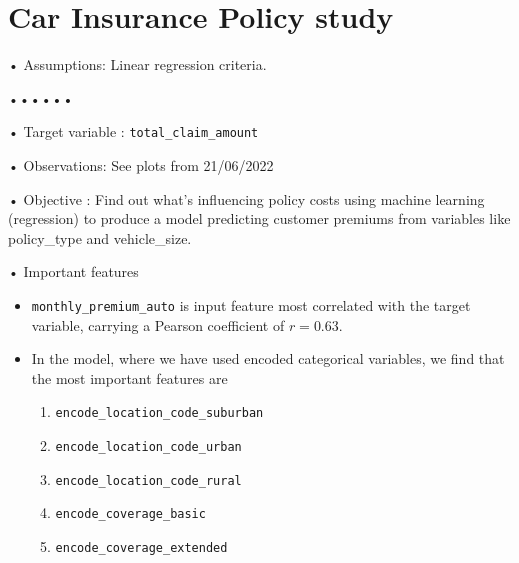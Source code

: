 \documentclass[11pt, oneside]{article}   	%
\newcommand{\code}[1]{\colorbox{light-gray}{\texttt{#1}}}
\def\code#1{\texttt{#1}}
\begin{document}
\section{Car Insurance Policy study}
• Assumptions: Linear regression criteria. \newline

••••••

• Target variable : \code{total\_claim\_amount} \newline
 
• Observations:  See plots from 21/06/2022 \newline

• Objective : Find out what's influencing policy costs using machine learning (regression) to produce a model predicting customer premiums from variables like policy\_type and vehicle\_size.\newline

• Important features 
\begin{itemize}
\item \code{monthly\_premium\_auto} is input feature most correlated with the target variable, carrying a Pearson coefficient of $r=0.63$.  
\item In the model, where we have used encoded categorical variables, we find that the most important features are
\begin{enumerate}
\item \code{encode\_location\_code\_suburban}
\item \code{encode\_location\_code\_urban}
\item \code{encode\_location\_code\_rural}
\item \code{encode\_coverage\_basic}
\item \code{encode\_coverage\_extended}
\end{enumerate}
\end{itemize}
\end{document}
